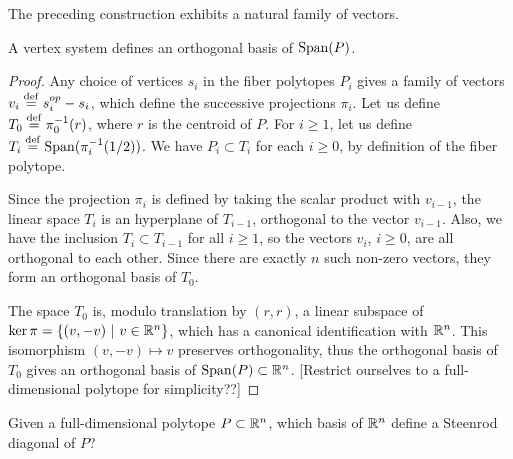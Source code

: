 The preceding construction exhibits a natural family of vectors. 

\begin{theorem}
    A vertex system defines an orthogonal basis of $\operatorname{\mathrm{Span}}(P)$.
\end{theorem}

\begin{proof}
    Any choice of vertices $s_i$ in the fiber polytopes $P_i$ gives a family of vectors $v_i \stackrel{\mathrm{def}}{=} s_i^{op} - s_i$, which define the successive projections $\pi_i$. Let us define $T_0 \stackrel{\mathrm{def}}{=} \pi_0^{-1}(r)$, where $r$ is the centroid of $P$. For $i \geq 1$, let us define $T_i \stackrel{\mathrm{def}}{=} \operatorname{\mathrm{Span}}(\pi_{i}^{-1}(1/2))$. We have $P_i \subset T_i$ for each $i \geq 0$, by definition of the fiber polytope. 
    
    Since the projection $\pi_i$ is defined by taking the scalar product with $v_{i-1}$, the linear space $T_i$ is an hyperplane of $T_{i-1}$, orthogonal to the vector $v_{i-1}$. Also, we have the inclusion $T_i \subset T_{i-1}$ for all $i\geq 1$, so the vectors $v_i$, $i \geq 0$, are all orthogonal to each other. Since there are exactly $n$ such non-zero vectors, they form an orthogonal basis of $T_0$. 
    
    The space $T_0$ is, modulo translation by $(r,r)$, a linear subspace of $\ker \pi = \{(v,-v) \ | \ v \in \mathbb{R}^n \}$, which has a canonical identification with $\mathbb{R}^n$. This isomorphism $(v,-v) \mapsto v$ preserves orthogonality, thus the orthogonal basis of $T_0$ gives an orthogonal basis of $\operatorname{\mathrm{Span}}(P) \subset \mathbb{R}^n$. [Restrict ourselves to a full-dimensional polytope for simplicity??]
\end{proof}


\begin{question}
    Given a full-dimensional polytope $P \subset \mathbb{R}^n$, which basis of $\mathbb{R}^n$ define a Steenrod diagonal of $P$?
\end{question}

\begin{example}
\end{example}

\begin{example}[Zonotopes]
\end{example}





